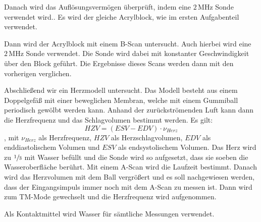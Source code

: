 Danach wird das Auflösungsvermögen überprüft, indem eine $2 \,\si{\mega\hertz}$
Sonde verwendet wird.. Es wird der gleiche Acrylblock, wie im ersten Aufgabenteil verwendet.

Dann wird der Acrylblock mit einem B-Scan untersucht. Auch hierbei wird eine $2 \,\si{\mega\hertz}$
Sonde verwendet. Die Sonde wird dabei mit konstanter Geschwindigkeit über den Block geführt.
Die Ergebnisse dieses Scans werden dann mit den vorherigen verglichen.

Abschließend wir ein Herzmodell untersucht. Das Modell besteht aus
einem Doppelgefäß mit einer beweglichen Membran, welche mit einem Gummiball periodisch gewölbt werden
kann. Anhand der zurückströmenden Luft kann dann die Herzfrequenz und das Schlagvolumen
bestimmt werden. Es gilt:
\begin{equation}
  HZV = (ESV - EDV)\cdot  \nu_{Herz}
\end{equation}
, mit $\nu_{Herz}$ als Herzfrequenz, $HZV$ als Herzschlagvolumen, $EDV$ als
enddiastolischem Volumen und $ESV$ als endsystolischem Volumen.
Das Herz wird zu $\sfrac{1}{3}$ mit Wasser befüllt und die Sonde wird so aufgesetzt,
dass sie soeben die Wasseroberfläche berührt. Mit einem A-Scan wird die Laufzeit
bestimmt. Danach wird das Herzvolumen mit dem Ball vergrößert und es soll nachgewiesen
werden, dass der Eingangsimpuls immer noch mit dem A-Scan zu messen ist.
Dann wird zum TM-Mode gewechselt und die Herzfrequenz wird aufgenommen.

Als Kontaktmittel wird Wasser für sämtliche Messungen verwendet.
